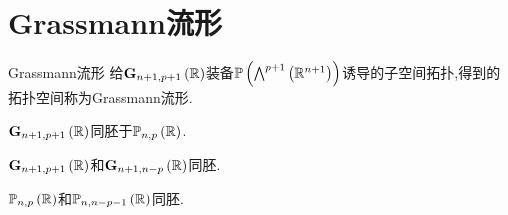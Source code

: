 \section{Grassmann流形}

\begin{definition}{Grassmann流形}{}
	给$\mathbf{G}_{n+1,p+1}\left(\mathbb{R}\right)$装备$\mathbb{P}\left(\bigwedge^{p+1}\left(\mathbb{R}^{n+1}\right)\right)$诱导的子空间拓扑,得到的拓扑空间称为Grassmann流形.
\end{definition}

\begin{proposition}{}{}
	$\mathbf{G}_{n+1,p+1}\left(\mathbb{R}\right)$同胚于$\mathbb{P}_{n,p}\left(\mathbb{R}\right)$.
\end{proposition}

\begin{corollary}{}{}
	$\mathbf{G}_{n+1,p+1}\left(\mathbb{R}\right)$和$\mathbf{G}_{n+1,n-p}\left(\mathbb{R}\right)$同胚.
\end{corollary}

\begin{corollary}{}{}
	$\mathbb{P}_{n,p}\left(\mathbb{R}\right)$和$\mathbb{P}_{n,n-p-1}\left(\mathbb{R}\right)$同胚.
\end{corollary}